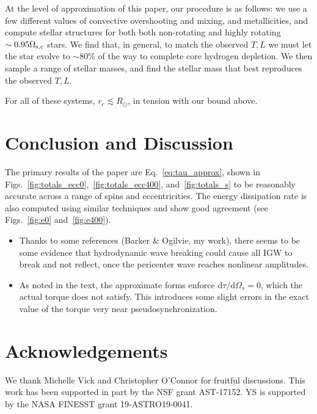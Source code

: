 \documentclass[
        fleqn,
        usenatbib,
        referee,
    ]{mnras}
\newcommand*{\rdil}[2]{\mathrm{d}#1 / \mathrm{d}#2}
\begin{document}
At the level of approximation of this paper, our procedure is as follows: we
use a few different values of convective overshooting and mixing, and
metallicities, and compute stellar structures for both both non-rotating and
highly rotating $\sim 0.95\Omega_{\rm s, c}$ stars. We find that, in general, to
match the observed $T, L$ we must let the star evolve to $\sim 80\%$ of the way
to complete core hydrogen depletion. We then sample a range of stellar masses,
and find the stellar mass that best reproduces the observed $T, L$.

For all of these systems, $r_c \lesssim R_{\odot}$, in tension with our bound
above.

\section{Conclusion and Discussion}\label{s:disc}

The primary results of the paper are Eq.~\eqref{eq:tau_approx}, shown in
Figs.~\ref{fig:totals_ecc0},~\ref{fig:totals_ecc400},
and~\ref{fig:totals_s} to be reasonably accurate across a range of spins
and eccentricities. The energy dissipation rate is also computed using similar
techniques and show good agreement (see Figs.~\ref{fig:e0}
and~\ref{fig:e400}).

\begin{itemize}
    \item Thanks to some references (Barker \& Ogilvie, my work), there seems to
        be some evidence that hydrodynamic wave breaking could cause all IGW to
        break and not reflect, once the pericenter wave reaches nonlinear
        amplitudes.

    \item As noted in the text, the approximate forms enforce
        $\rdil{\tau}{\Omega_s} = 0$, which the actual torque does not satisfy.
        This introduces some slight errors in the exact value of the torque very
        near pseudosynchronization.
\end{itemize}

\section{Acknowledgements}

We thank Michelle Vick and Christopher O'Connor for fruitful discussions. This
work has been supported in part by the NSF grant AST-17152. YS is supported by
the NASA FINESST grant 19-ASTRO19-0041.%





\bsp
\label{lastpage} %
\end{document}

